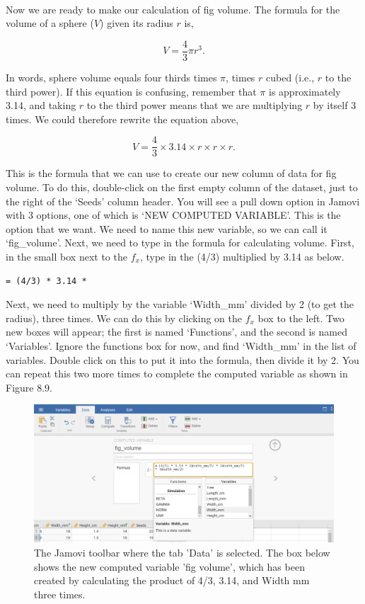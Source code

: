 \documentclass[
]{scrbook}
\begin{document}
\begin{verbatim}




\end{verbatim}

Now we are ready to make our calculation of fig volume.
The formula for the volume of a sphere (\(V\)) given its radius \(r\) is,

\[V = \frac{4}{3} \pi r^{3}.\]

In words, sphere volume equals four thirds times \(\pi\), times \(r\) cubed (i.e., \(r\) to the third power).
If this equation is confusing, remember that \(\pi\) is approximately 3.14, and taking \(r\) to the third power means that we are multiplying \(r\) by itself 3 times.
We could therefore rewrite the equation above,

\[V = \frac{4}{3} \times 3.14 \times r \times r \times r.\]

This is the formula that we can use to create our new column of data for fig volume.
To do this, double-click on the first empty column of the dataset, just to the right of the `Seeds' column header.
You will see a pull down option in Jamovi with 3 options, one of which is `NEW COMPUTED VARIABLE'.
This is the option that we want.
We need to name this new variable, so we can call it `fig\_volume'.
Next, we need to type in the formula for calculating volume.
First, in the small box next to the \(f_{x}\), type in the (4/3) multiplied by 3.14 as below.

\begin{verbatim}
= (4/3) * 3.14 *
\end{verbatim}

Next, we need to multiply by the variable `Width\_mm' divided by 2 (to get the radius), three times. We can do this by clicking on the \(f_{x}\) box to the left.
Two new boxes will appear; the first is named `Functions', and the second is named `Variables'.
Ignore the functions box for now, and find `Width\_mm' in the list of variables.
Double click on this to put it into the formula, then divide it by 2.
You can repeat this two more times to complete the computed variable as shown in Figure 8.9.

\begin{figure}
\includegraphics[width=1\linewidth]{img/jamovi_compute_new_variable} \caption{The Jamovi toolbar where the tab 'Data' is selected. The box below shows the new computed variable 'fig volume', which has been created by calculating the product of 4/3, 3.14, and Width mm three times.}\label{fig:unnamed-chunk-33}
\end{figure}
\end{document}
